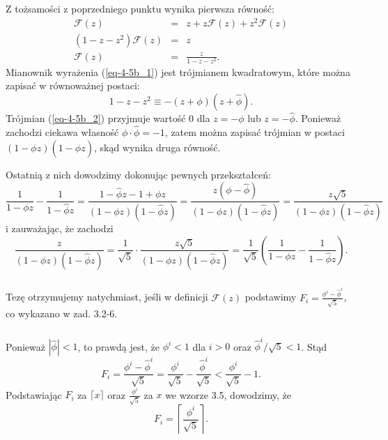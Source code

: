 \subsubsection{} %
Z tożsamości z poprzedniego punktu wynika pierwsza równość:
\begin{eqnarray}
	\mathcal{F}(z) &=& z+z\mathcal{F}(z)+z^2\mathcal{F}(z)\nonumber \\
	\left(1-z-z^2\right)\mathcal{F}(z) &=& z\nonumber \\
	\mathcal{F}(z) &=& \frac{z}{1-z-z^2}.\label{eq-4-5b_1}
\end{eqnarray}
Mianownik wyrażenia (\ref{eq-4-5b_1}) jest trójmianem kwadratowym, które można zapisać w równoważnej postaci:
\begin{equation}
	1-z-z^2\equiv -(z+\phi)\left(z+\widehat\phi\right).\label{eq-4-5b_2}
\end{equation}
Trójmian (\ref{eq-4-5b_2}) przyjmuje wartość $0$ dla $z=-\phi$ lub $z=-\widehat\phi$. Ponieważ zachodzi ciekawa własność $\phi\cdot\widehat\phi=-1$, zatem można zapisać trójmian w postaci $(1-\phi z)(1-\widehat\phi z)$, skąd wynika druga równość.

Ostatnią z nich dowodzimy dokonując pewnych przekształceń:
\[
	\frac{1}{1-\phi z}-\frac{1}{1-\widehat\phi z} = \frac{1-\widehat\phi z-1+\phi z}{(1-\phi z)\left(1-\widehat\phi z\right)} = \frac{z\left(\phi-\widehat\phi\right)}{(1-\phi z)\left(1-\widehat\phi z\right)} = \frac{z\sqrt{5}}{(1-\phi z)\left(1-\widehat\phi z\right)}
\]
i zauważając, że zachodzi
\[
	\frac{z}{(1-\phi z)\left(1-\widehat\phi z\right)} = \frac{1}{\sqrt{5}}\cdot\frac{z\sqrt{5}}{(1-\phi z)\left(1-\widehat\phi z\right)} = \frac{1}{\sqrt{5}}\left(\frac{1}{1-\phi z}-\frac{1}{1-\widehat\phi z}\right).
\]

\subsubsection{} %
Tezę otrzymujemy natychmiast, jeśli w definicji $\mathcal{F}(z)$ podstawimy $F_i=\frac{\phi^i-\widehat\phi^i}{\sqrt{5}}$, co wykazano w zad. 3.2-6.

\subsubsection{} %
Ponieważ $|\widehat\phi|<1$, to prawdą jest, że $\phi^i<1$ dla $i>0$ oraz $\widehat\phi^i/\sqrt{5}<1$. Stąd
\[
	F_i = \frac{\phi^i-\widehat\phi^i}{\sqrt{5}} = \frac{\phi^i}{\sqrt{5}}-\frac{\widehat\phi^i}{\sqrt{5}} < \frac{\phi^i}{\sqrt{5}}-1.
\]
Podstawiając $F_i$ za $\lceil x\rceil$ oraz $\frac{\phi^i}{\sqrt{5}}$ za $x$ we wzorze 3.5, dowodzimy, że
\[
	F_i=\left\lceil\frac{\phi^i}{\sqrt{5}}\right\rceil.
\]

